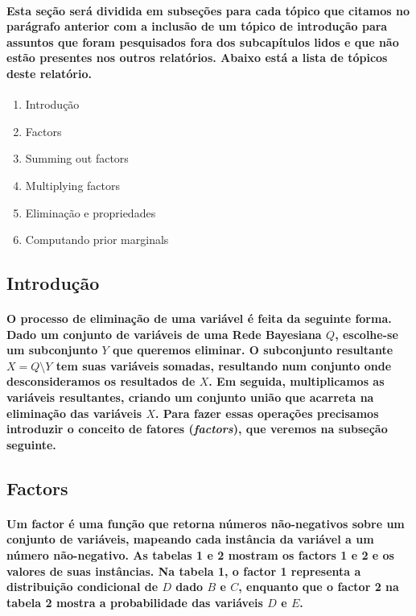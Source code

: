 \documentclass[a4paper,10pt]{article}
\theoremstyle{plain}
\begin{document}
\paragraph{
  Esta seção será dividida em subseções para cada tópico que citamos no parágrafo anterior com a
inclusão de um tópico de introdução para assuntos que foram pesquisados fora dos subcapítulos lidos
e que não estão presentes nos outros relatórios. Abaixo está a lista de tópicos deste relatório.
}
\begin{enumerate}
  \item Introdução
  \item Factors
  \item Summing out factors
  \item Multiplying factors
  \item Eliminação e propriedades
  \item Computando prior marginals
\end{enumerate}

\subsection{Introdução}

\paragraph{
  O processo de eliminação de uma variável é feita da seguinte forma. Dado um conjunto de variáveis
de uma Rede Bayesiana $Q$, escolhe-se um subconjunto $Y$ que queremos eliminar. O subconjunto 
resultante $X = Q \setminus Y$ tem suas variáveis somadas, resultando num conjunto onde 
desconsideramos os
resultados de $X$. Em seguida, multiplicamos as variáveis resultantes, criando um conjunto união 
que acarreta na eliminação das variáveis $X$. Para fazer essas operações precisamos introduzir o
conceito de fatores (\textit{factors}), que veremos na subseção seguinte.
}

\subsection{Factors}

\paragraph{
  Um factor é uma função que retorna números não-negativos sobre um conjunto de variáveis, mapeando 
cada instância da variável a um número não-negativo. As tabelas 1 e 2 mostram os factors 1 e 2 e 
os valores de suas instâncias. Na tabela 1, o factor 1 representa a distribuição condicional de
$D$ dado $B$ e $C$, enquanto que o factor 2 na tabela 2 mostra a probabilidade das variáveis $D$ e
$E$.
}
\end{document}
